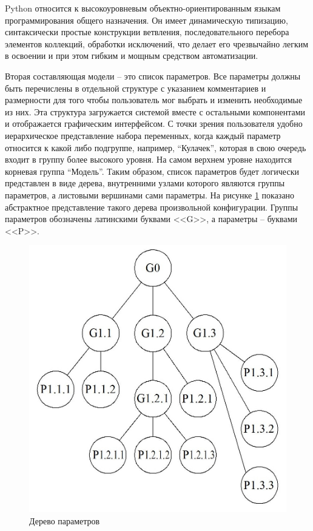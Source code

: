 \documentclass[14pt,oneside,final]{extreport}
\begin{document}
	Python относится к высокоуровневым объектно-ориентированным языкам программирования общего назначения. Он имеет динамическую типизацию, синтаксически простые конструкции ветвления, последовательного перебора элементов коллекций, обработки исключений, что делает его чрезвычайно легким в освоении и при этом гибким и мощным средством автоматизации. 
	
	Вторая составляющая модели -- это список параметров. Все параметры должны быть перечислены в отдельной структуре с указанием комментариев и размерности для того чтобы пользователь мог выбрать и изменить необходимые из них. Эта структура загружается системой вместе с остальными компонентами и отображается графическим интерфейсом.  С точки зрения пользователя удобно иерархическое представление набора переменных, когда каждый параметр относится к какой либо подгруппе, например, ``Кулачек'', которая в свою очередь входит в группу более высокого уровня. На самом верхнем уровне находится корневая группа ``Модель''. Таким образом, список параметров будет логически представлен в виде дерева, внутренними узлами которого являются группы параметров, а листовыми вершинами сами параметры. На рисунке \ref{fig:model-tree-abstract} показано абстрактное представление такого дерева произвольной конфигурации. Группы параметров обозначены латинскими буквами <<G>>, а параметры -- буквами <<P>>.  
	
	\begin{figure}[!h]
		\begin{center}
			\includegraphics[scale=1]{img/model-tree-abstract} 
		\end{center}
		\caption{Дерево параметров}
		\label{fig:model-tree-abstract}
	\end{figure}
		
\end{document}

